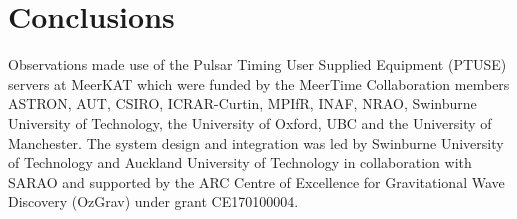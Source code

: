 \documentclass[preprint2,linenumbers]{aastex631}
\begin{document}
\section{Conclusions} \label{sec:conclusions}

\begin{acknowledgments}

Observations made use of the Pulsar Timing User Supplied Equipment (PTUSE) servers at MeerKAT which were funded by the MeerTime Collaboration members ASTRON, AUT, CSIRO, ICRAR-Curtin, MPIfR, INAF, NRAO, Swinburne University of Technology, the University of Oxford, UBC and the University of Manchester.  The system design and integration was led by Swinburne University of Technology and Auckland University of Technology in collaboration with SARAO and supported by the ARC Centre of Excellence for Gravitational Wave Discovery (OzGrav) under grant CE170100004.


\end{acknowledgments}

%




\end{document}
